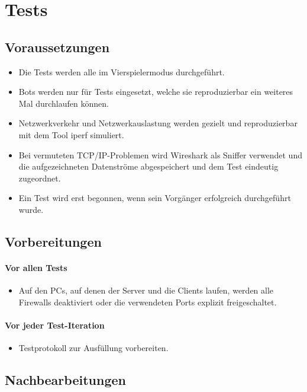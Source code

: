 \documentclass[12pt,halfparskip]{scrartcl}
\begin{document}
\newpage

\section{Tests}
\subsection{Voraussetzungen}
\begin{itemize}
	\item Die Tests werden alle im Vierspielermodus durchgeführt.
	\item Bots werden nur für Tests eingesetzt, welche sie reproduzierbar ein weiteres Mal durchlaufen können.
	\item Netzwerkverkehr und Netzwerkauslastung werden gezielt und reproduzierbar mit dem Tool iperf simuliert.
	\item Bei vermuteten TCP/IP-Problemen wird Wireshark als Sniffer verwendet und die aufgezeichneten Datenströme abgespeichert und dem Test eindeutig zugeordnet.
	\item Ein Test wird erst begonnen, wenn sein Vorgänger erfolgreich durchgeführt wurde.
\end{itemize}

\subsection{Vorbereitungen}
\paragraph{Vor allen Tests}\label{ssub:vorbereitungen_vor_allen_tests} 
	\begin{itemize}
		\item Auf den PCs, auf denen der Server und die Clients laufen, werden alle Firewalls deaktiviert oder die verwendeten Ports explizit freigeschaltet.
	\end{itemize}

\paragraph{Vor jeder Test-Iteration}\label{ssub:vorbereitungen_vor_jeder_testiteration}
	\begin{itemize}
		\item Testprotokoll zur Ausfüllung vorbereiten.
	\end{itemize}

\subsection{Nachbearbeitungen}\label{sec:nachbearbeitungen}
\end{document}
